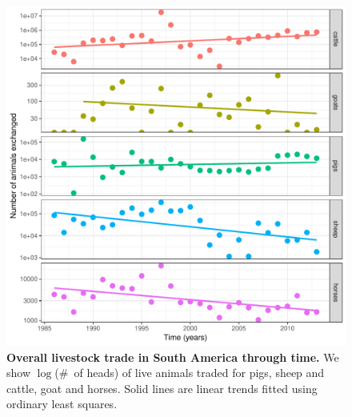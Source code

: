 \documentclass[a4paper,10pt]{article}
\begin{document}
\begin{center}
\begin{figure}[H]
\begin{center}
\includegraphics[scale=.80]{FIGURES/PLOTS/trade_through_time.pdf}
\end{center}
\caption{
\textbf{Overall livestock trade in South America through time.}
We show $\log$(\#~of heads) of live animals traded for pigs, sheep and cattle, goat and horses.
Solid lines are linear trends fitted using ordinary least squares.
}
\label{sfig:trade_temporal}
\end{figure}
\end{center}
\newpage
\end{document}
